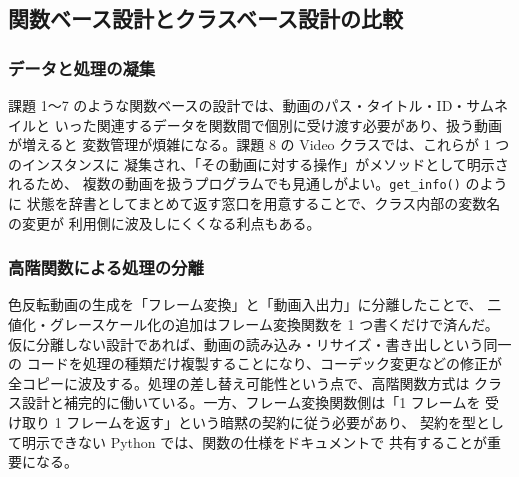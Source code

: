 \subsection{関数ベース設計とクラスベース設計の比較}

\subsubsection{データと処理の凝集}

課題 1〜7 のような関数ベースの設計では、動画のパス・タイトル・ID・サムネイルと
いった関連するデータを関数間で個別に受け渡す必要があり、扱う動画が増えると
変数管理が煩雑になる。課題 8 の Video クラスでは、これらが 1 つのインスタンスに
凝集され、「その動画に対する操作」がメソッドとして明示されるため、
複数の動画を扱うプログラムでも見通しがよい。{\tt get\_info()} のように
状態を辞書としてまとめて返す窓口を用意することで、クラス内部の変数名の変更が
利用側に波及しにくくなる利点もある。

\subsubsection{高階関数による処理の分離}

色反転動画の生成を「フレーム変換」と「動画入出力」に分離したことで、
二値化・グレースケール化の追加はフレーム変換関数を 1 つ書くだけで済んだ。
仮に分離しない設計であれば、動画の読み込み・リサイズ・書き出しという同一の
コードを処理の種類だけ複製することになり、コーデック変更などの修正が
全コピーに波及する。処理の差し替え可能性という点で、高階関数方式は
クラス設計と補完的に働いている。一方、フレーム変換関数側は「1 フレームを
受け取り 1 フレームを返す」という暗黙の契約に従う必要があり、
契約を型として明示できない Python では、関数の仕様をドキュメントで
共有することが重要になる。
